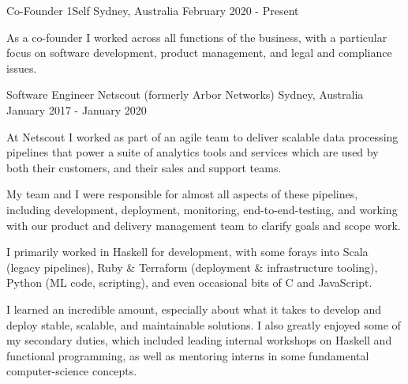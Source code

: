 


\begin{cventries}


\cventry
{Co-Founder} %
{1Self} %
{Sydney, Australia} %
{February 2020 - Present} %
{ %
\begin{cvitems}
\item {As a co-founder I worked across all functions of the business, with a particular focus on software development, product management, and legal and compliance issues.}
\end{cvitems}
\vspace{2.0mm} 
}


\cventry
{Software Engineer} %
{Netscout (formerly Arbor Networks)} %
{Sydney, Australia} %
{January 2017 - January 2020 } %
{ %
\begin{cvitems}
\item {At Netscout I worked as part of an agile team to deliver scalable data processing pipelines that power a suite of analytics tools and services which are used by both their customers, and their sales and support teams.}
\item {My team and I were responsible for almost all aspects of these pipelines, including development, deployment, monitoring, end-to-end-testing, and working with our product and delivery management team to clarify goals and scope work.}
\item {I primarily worked in Haskell for development, with some forays into Scala (legacy pipelines), Ruby \& Terraform (deployment \& infrastructure tooling), Python (ML code, scripting), and even occasional bits of C and JavaScript.}
\item {I learned an incredible amount, especially about what it takes to develop and deploy stable, scalable, and maintainable solutions. I also greatly enjoyed some of my secondary duties, which included leading internal workshops on Haskell and functional programming, as well as mentoring interns in some fundamental computer-science concepts.}
\end{cvitems}
\vspace{2.0mm}
}


\end{cventries}
